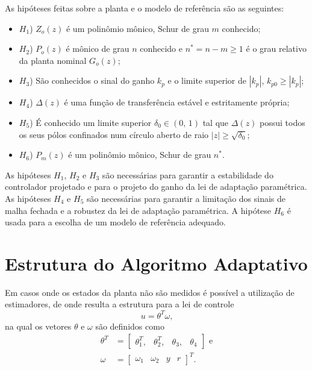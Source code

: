   As hipóteses feitas sobre a planta e o modelo de referência são as seguintes:

  \begin{itemize}
    \item[] $H_1$) $Z_o(z)$ é um polinômio mônico, Schur de grau $m$ conhecido;
    \item[] $H_2$) $P_o(z)$ é mônico de grau $n$ conhecido e $n^* = n - m \geq 1$ é o grau relativo da planta nominal $G_o(z)$;
    \item[] $H_3$) São conhecidos o sinal do ganho $k_p$ e o limite superior de $|k_p|$, $k_{p0} \geq |k_p|$;
    \item[] $H_4$) $\Delta(z)$ é uma função de transferência estável e estritamente própria;
    \item[] $H_5$) É conhecido um limite superior $\delta_0 \in (0, \, 1)$ tal que $\Delta(z)$ possui todos os seus pólos confinados num círculo aberto de raio $|z| \geq \sqrt{\delta_0}$;
    \item[] $H_6$) $P_m(z)$ é um polinômio mônico, Schur de grau $n^*$.
  \end{itemize}

  As hipóteses $H_1$, $H_2$ e $H_3$ são necessárias para garantir a estabilidade do controlador projetado e para o projeto do ganho da lei de adaptação paramétrica. As hipóteses $H_4$ e $H_5$ são necessárias para garantir a limitação dos sinais de malha fechada e a robustez da lei de adaptação paramétrica. A hipótese $H_6$ é usada para a escolha de um modelo de referência adequado.

\section{Estrutura do Algoritmo Adaptativo}

  Em casos onde os estados da planta não são medidos é possível a utilização de estimadores, de onde resulta a estrutura para a lei de controle~\cite{ref:TAO}
  \begin{equation}
    u = \theta^T \omega\text{,}
  \end{equation}
  na qual os vetores $\theta$ e $\omega$ são definidos como
  \begin{equation}
    \begin{split}
      \theta^T & = \left[ \begin{matrix} \theta_1^T, & \theta_2^T, & \theta_3, & \theta_4 \end{matrix} \right]\text{ e}\\
      \omega & = {\left[ \begin{matrix} \omega_1 & \omega_2 & y & r \end{matrix} \right]}^T\text{.}
    \end{split}
  \end{equation}

